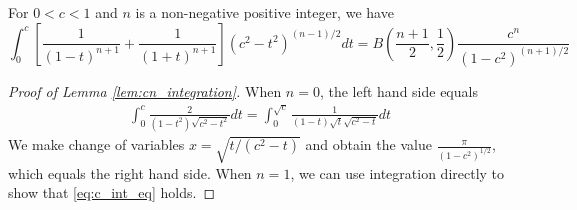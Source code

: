 \documentclass{aptpub}
\begin{document}
\begin{lemma}\label{lem:cn_integration}
For $0<c<1$ and $n$ is a non-negative positive integer, we have
\begin{equation}
    \int_0^{c}
    [\frac{1}{(1-t)^{n+1}}+\frac{1}{(1+t)^{n+1}}]
    (c^2- t^2)^{(n-1)/2}dt
    =B(\frac{n+1}{2}, \frac{1}{2})
    \frac{c^n}{(1-c^2)^{(n+1)/2}}
    \end{equation}\label{eq:c_int_eq}
\end{lemma}
\begin{proof}[Proof of Lemma \ref{lem:cn_integration}]
     When $n=0$, the left hand side equals
     \begin{align*}
          \int_0^c \frac{2}{(1-t^2)\sqrt{c^2-t^2}} dt
          = \int_0^{\sqrt{c}} \frac{1}{(1-t) \sqrt{t} \sqrt{c^2-t} }dt
     \end{align*}     
     We make change of variables $x=\sqrt{t/(c^2-t)}$ and obtain
     the value $\frac{\pi}{(1-c^2)^{1/2}}$, which equals
     the right hand side.
     When $n=1$, we can use integration directly
     to show that \eqref{eq:c_int_eq} holds.


\end{proof}
\end{document}
